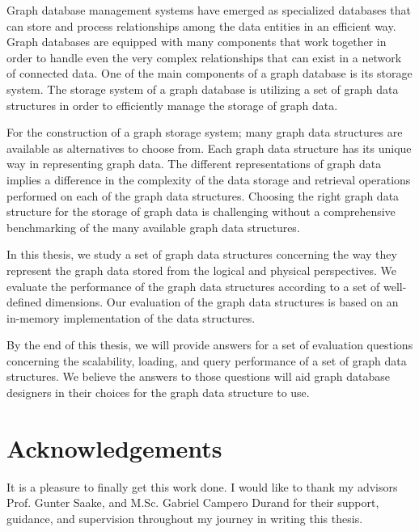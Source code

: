 
Graph database management systems have emerged as specialized databases that can store and process relationships among the data entities in an efficient way. Graph databases are equipped with many components that work together in order to handle even the very complex relationships that can exist in a network of connected data. One of the main components of a graph database is its storage system. The storage system of a graph database is utilizing a set of graph data structures in order to efficiently manage the storage of graph data. 

For the construction of a graph storage system; many graph data structures are available as alternatives to choose from. Each graph data structure has its unique way in representing graph data. The different representations of graph data implies a difference in the complexity of the data storage and retrieval operations performed on each of the graph data structures. Choosing the right graph data structure for the storage of graph data is challenging without a comprehensive benchmarking of the many available graph data structures.

In this thesis, we study a set of graph data structures concerning the way they represent the graph data stored from the logical and physical perspectives. We evaluate the performance of the graph data structures according to a set of well-defined dimensions. Our evaluation of the graph data structures is based on an in-memory implementation of the data structures. 

By the end of this thesis, we will provide answers for a set of evaluation questions concerning the scalability, loading, and query performance of a set of graph data structures. We believe the answers to those questions will aid graph database designers in their choices for the graph data structure to use.

{\chapter*{Acknowledgements}}

It is a pleasure to finally get this work done. I would like to thank my advisors Prof. Gunter Saake, and M.Sc. Gabriel Campero Durand for their support, guidance, and supervision throughout my journey in writing this thesis. 

